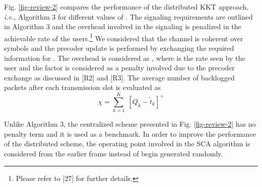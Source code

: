 \begin{enumerate}
	Fig. \ref{fig-review-2} compares the performance of the distributed \ac{KKT} approach, \textit{i.e.}, Algorithm 3 for different values of . The signaling requirements are outlined in Algorithm 3 and the overhead involved in the signaling is penalized in the achievable rate of the users.\footnote{Please refer to [27] for further details.} We considered that the channel is coherent over  symbols and the precoder update is performed by exchanging the required information for . The overhead is considered as , where  is the rate seen by the user and the factor  is considered as a penalty involved due to the precoder exchange as discussed in [R2] and [R3]. The average number of backlogged packets after each transmission slot is evaluated as 
	\begin{equation}
	\chi = \sum_{k = 1}^K \; [ Q_k - \tilde{t}_k ]^+
	\end{equation}
	
	Unlike Algorithm 3, the centralized scheme presented in Fig. \ref{fig-review-2} has no penalty term and it is used as a benchmark. In order to improve the performance of the distributed scheme, the operating point involved in the \ac{SCA} algorithm is considered from the earlier frame instead of begin generated randomly. 
	
	\begin{comment}
	Since we use \ac{KKT} approach, we can either use all users in the system for the precoder design or we can utilize single-cell MU-MIMO user selection presented in the literature to limit the number of users for which the precoders are designed, which leads to the faster convergence. As we can see from Fig. \ref{fig-review-2}, as the arrival rate per user increases, the performance of \ac{KKT} schemes with \eqn{J_{\max} = 3,5,10} converges since the number of backlogged packets are significantly large, therefore, the same set of users will be served by the algorithm with better precoders by utilizing the memory. 
	
	In spite of using memory and prior scheduling in the \ac{KKT} approach, isolated single \ac{BS} processing performs much better than the distributed scheme due to the limited number of iterations allowed in the algorithm. Note that the precoders are not updated for the desired users until convergence, after the limited number of iterations. However, if we perform the single cell precoder design by considering the neighboring precoders as fixed after the recent exchange as discussed in [28], we can improve the performance significantly for Algorithm 3 as shown by red curves in Fig. \ref{fig-review-2}. In this approach, in between each exchange across the coordinating \acp{BS}, each \ac{BS} will perform \eqn{J_{\max} = 20} with the neighboring precoders as fixed. Once the iterations are performed to update the precoders, it is then exchanged across the coordinating \acp{BS} to perform the same procedure as mentioned earlier. 
	\end{comment}
	

\end{enumerate}
